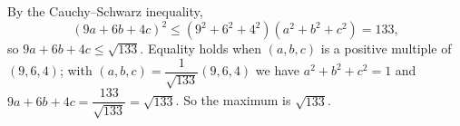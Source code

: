 By the Cauchy--Schwarz inequality,
\[(9a+6b+4c)^2\le\left(9^2+6^2+4^2\right)\left(a^2+b^2+c^2\right)=133,\]
so $9a+6b+4c\le\sqrt{133}$. Equality holds when $(a,b,c)$ is a positive multiple of $(9,6,4)$; with $(a,b,c)=\dfrac{1}{\sqrt{133}}(9,6,4)$ we have $a^2+b^2+c^2=1$ and $9a+6b+4c=\dfrac{133}{\sqrt{133}}=\sqrt{133}$. So the maximum is $\boxed{\sqrt{133}}$.
